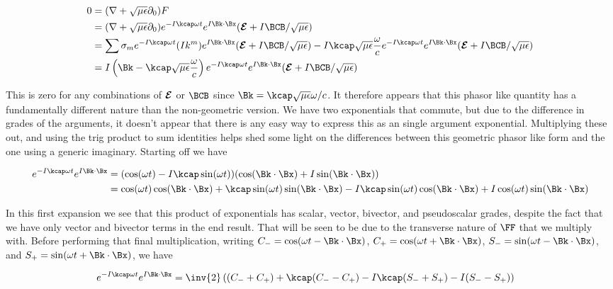 \begin{align*}
0 
&= (\grad + \sqrt{\mu\epsilon}\partial_0) F \\
&=
(\grad + \sqrt{\mu\epsilon}\partial_0) e^{ -I \kcap \omega t } e^{ I \Bk \cdot \Bx } (\EE + I\BCB/\sqrt{\mu\epsilon}) \\
&=
\sum \sigma_m e^{ -I \kcap \omega t } (I k^m) e^{ I \Bk \cdot \Bx } (\EE + I\BCB/\sqrt{\mu\epsilon}) 
-I \kcap \sqrt{\mu\epsilon} \frac{\omega}{c} e^{ -I \kcap \omega t } e^{ I \Bk \cdot \Bx } (\EE + I\BCB/\sqrt{\mu\epsilon}) \\
&=
I \left(\Bk - \kcap \sqrt{\mu\epsilon} \frac{\omega}{c} \right) e^{ -I \kcap \omega t } e^{ I \Bk \cdot \Bx } (\EE + I\BCB/\sqrt{\mu\epsilon}) 
\end{align*}

This is zero for any combinations of $\boldsymbol{\mathcal{E}}$ or $\BCB$ since $\Bk = \kcap \sqrt{\mu\epsilon} \omega/c$.  It therefore appears that this phasor like quantity has a fundamentally different nature than the non-geometric version.  We have two exponentials that commute, but due to the difference in grades of the arguments, it doesn't appear that there is any easy way to express this as an single argument exponential.  Multiplying these out, and using the trig product to sum identities helps shed some light on the differences between this geometric phasor like form and the one using a generic imaginary.  Starting off we have

\begin{align*}
e^{ -I \kcap \omega t } e^{ I \Bk \cdot \Bx }
&=
(\cos(\omega t) -I\kcap \sin(\omega t)) (\cos(\Bk \cdot \Bx) +I\sin(\Bk \cdot \Bx)) \\
&=
\cos(\omega t)\cos(\Bk \cdot \Bx) 
+ \kcap \sin(\omega t)\sin(\Bk \cdot \Bx)
-I\kcap \sin(\omega t)\cos(\Bk \cdot \Bx)
+I \cos(\omega t) \sin(\Bk \cdot \Bx) \\
\end{align*}

In this first expansion we see that this product of exponentials has scalar, vector, bivector, and pseudoscalar grades, despite the fact that we have only
vector and bivector terms in the end result.  That will be seen to be due to the transverse nature of $\FF$ that we multiply with.  Before performing that final multiplication, writing $C_{-} = \cos(\omega t - \Bk \cdot \Bx)$, $C_{+} = \cos(\omega t + \Bk \cdot \Bx)$, $S_{-} = \sin(\omega t - \Bk \cdot \Bx)$, and $S_{+} = \sin(\omega t + \Bk \cdot \Bx)$, we have 

\begin{align*}
e^{ -I \kcap \omega t } e^{ I \Bk \cdot \Bx }
&=
\inv{2}
\left( 
(C_{-} + C_{+})
+\kcap (C_{-} - C_{+})
-I \kcap (S_{-} + S_{+})
-I (S_{-} - S_{+})
\right)
\end{align*}

